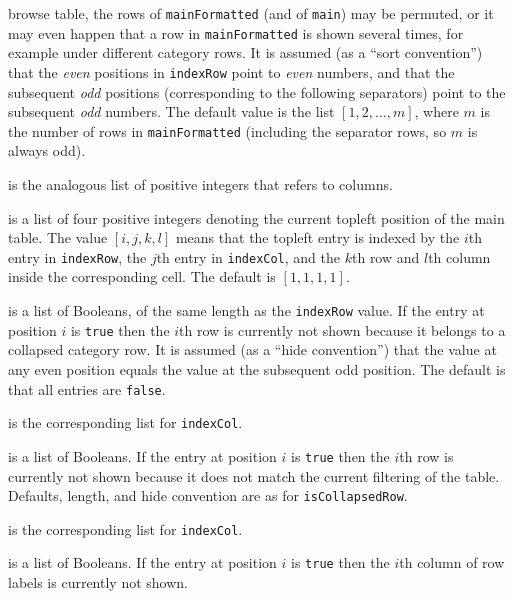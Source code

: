 \documentclass[a4paper,11pt]{report}
\begin{document}
{{{\begin{description}
browse table, the rows of \texttt{mainFormatted} (and of \texttt{main}) may be permuted, or it may even happen that a row in \texttt{mainFormatted} is shown several times, for example under different category rows. It is
assumed (as a ``sort convention'')  that the \emph{even} positions in \texttt{indexRow} point to \emph{even} numbers, and that the subsequent \emph{odd} positions (corresponding to the following separators) point to the subsequent \emph{odd} numbers. The default value is the list $[ 1, 2, \ldots, m ]$, where $m$ is the number of rows in \texttt{mainFormatted} (including the separator rows, so $m$ is always odd). 
\item[{\texttt{indexCol}}]  is the analogous list of positive integers that refers to columns. 
\item[{\texttt{topleft}}]  is a list of four positive integers denoting the current topleft position of
the main table. The value $[ i, j, k, l ]$ means that the topleft entry is indexed by the $i$\texttt{}th entry in \texttt{indexRow}, the $j$\texttt{}th entry in \texttt{indexCol}, and the $k$\texttt{}th row and $l$\texttt{}th column inside the corresponding cell. The default is $[ 1, 1, 1, 1 ]$. 
\item[{\texttt{isCollapsedRow}}]  is a list of Booleans, of the same length as the \texttt{indexRow} value. If the entry at position $i$ is \texttt{true} then the $i$\texttt{}th row is currently not shown because it belongs to a
collapsed category row. It is assumed (as a ``hide convention'')  that the value at any even position equals the value at the subsequent odd
position. The default is that all entries are \texttt{false}. 
\item[{\texttt{isCollapsedCol}}]  is the corresponding list for \texttt{indexCol}. 
\item[{\texttt{isRejectedRow}}]  is a list of Booleans. If the entry at position $i$ is \texttt{true} then the $i$\texttt{}th row is currently not shown because it does not match
the current filtering of the table. Defaults, length, and hide convention are
as for \texttt{isCollapsedRow}. 
\item[{\texttt{isRejectedCol}}]  is the corresponding list for \texttt{indexCol}. 
\item[{\texttt{isRejectedLabelsRow}}]  is a list of Booleans. If the entry at position $i$ is \texttt{true} then the $i$\texttt{}th column of row labels is currently not shown. 

\end{description}}}}
\end{document}
